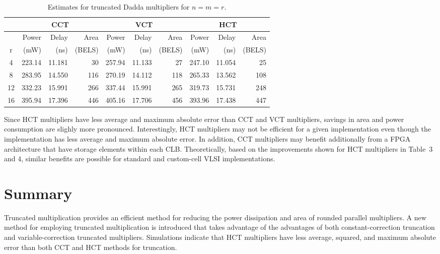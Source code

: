 \begin{table*}
\centering
\label{tarray2.tbl}
\begin{tabular}{|c|r|r|r||r|r|r||r|r|r||} \hline
\multicolumn{1}{|c|}{} & \multicolumn{3}{|c||}{CCT} &
\multicolumn{3}{|c||}{VCT} &  \multicolumn{3}{|c||}{HCT} \\ \hline
   & Power & Delay & Area & Power & Delay & Area &
Power & Delay & Area \\ 
r  & (mW) & (ns) & (BELS) & (mW) & (ns) & (BELS) &
(mW) & (ns) & (BELS) \\ \hline \hline
4  & 223.14 & 11.181 &  30 & 257.94 & 11.133 & 27  &
 247.10 & 11.054 &  25 \\ \hline 
8  & 283.95 & 14.550 & 116 & 270.19 & 14.112 & 118  &
 265.33 & 13.562 & 108 \\ \hline 
12 & 332.23 & 15.991 & 266 & 337.44 & 15.991 & 265 &
319.73 & 15.731 & 248 \\ \hline 
16 & 395.94 & 17.396 & 446 & 405.16 & 17.706 & 456 &
393.96 & 17.438 & 447 \\ \hline 
\end{tabular}
\caption{Estimates for truncated Dadda multipliers for $n=m=r$.}
\end{table*}

Since HCT multipliers have less average and 
maximum absolute error than CCT and VCT multipliers, savings in 
area and power
consumption are slighly more pronounced.  Interestingly, HCT multipliers may
not be efficient for a given implementation even though the implementation
has less average and maximum absolute error.  In addition, 
CCT multipliers may benefit
additionally
from a FPGA architecture
that have storage elements within each CLB.  Theoretically, based on the
improvements shown for HCT multipliers in Table~$3$ and $4$, 
similar benefits are possible for
standard and custom-cell VLSI implementations.

\section{Summary}

Truncated multiplication provides an efficient method for 
reducing the power dissipation and area of rounded parallel 
multipliers. A new method for employing truncated multiplication
is introduced that takes advantage of the advantages of both
constant-correction truncation and variable-correction truncated
multipliers.  Simulations indicate that
HCT multipliers have less
average, squared, and maximum absolute error than both CCT
and HCT methods for truncation.  

